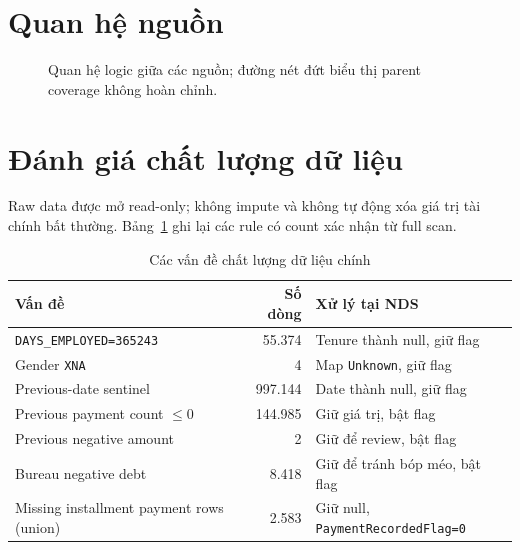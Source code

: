 \documentclass[12pt,a4paper,oneside]{report}
\begin{document}
\section{Quan hệ nguồn}
\begin{figure}[H]
\centering
{}
\caption{Quan hệ logic giữa các nguồn; đường nét đứt biểu thị parent coverage không hoàn chỉnh.}
\label{fig:source-rel}
\end{figure}

\section{Đánh giá chất lượng dữ liệu}
Raw data được mở read-only; không impute và không tự động xóa giá trị tài chính bất thường. Bảng~\ref{tab:dq} ghi lại các rule có count xác nhận từ full scan.

\begin{table}[H]
\centering
\caption{Các vấn đề chất lượng dữ liệu chính}\label{tab:dq}
\begin{tabularx}{\textwidth}{XrX}
\toprule
Vấn đề & Số dòng & Xử lý tại NDS \\
\midrule
\texttt{DAYS\_EMPLOYED=365243} & 55.374 & Tenure thành null, giữ flag \\
Gender \texttt{XNA} & 4 & Map \texttt{Unknown}, giữ flag \\
Previous-date sentinel & 997.144 & Date thành null, giữ flag \\
Previous payment count $\leq 0$ & 144.985 & Giữ giá trị, bật flag \\
Previous negative amount & 2 & Giữ để review, bật flag \\
Bureau negative debt & 8.418 & Giữ để tránh bóp méo, bật flag \\
Missing installment payment rows (union) & 2.583 & Giữ null, \texttt{PaymentRecordedFlag=0} \\
\bottomrule
\end{tabularx}
\end{table}
\end{document}
